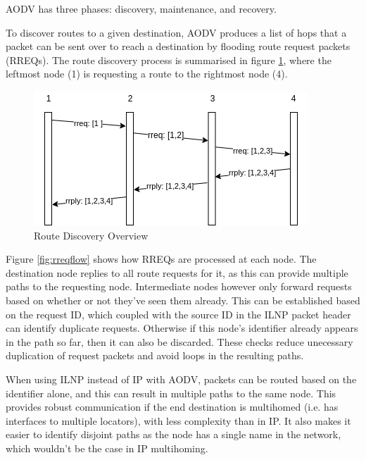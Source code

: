 \documentclass[12pt]{article}
\begin{document}
AODV has three phases: discovery, maintenance, and recovery.

To discover routes to a given destination, AODV produces a list of hops that a packet can be sent over to reach a destination by flooding route request packets (RREQs). The route discovery process is summarised in figure \ref{fig:path}, where the leftmost node (1) is requesting a route to the rightmost node (4).

\begin{figure}[!ht]
	\centering
	\includegraphics[width=\linewidth]{images/path}
	\caption{Route Discovery Overview}
	\label{fig:path}
\end{figure}

Figure \ref{fig:rreqflow} shows how RREQs are processed at each node. The destination node replies to all route requests for it, as this can provide multiple paths to the requesting node. Intermediate nodes however only forward requests based on whether or not they've seen them already. This can be established based on the request ID, which coupled with the source ID in the ILNP packet header can identify duplicate requests. Otherwise if this node's identifier already appears in the path so far, then it can also be discarded. These checks reduce unecessary duplication of request packets and avoid loops in the resulting paths.

When using ILNP instead of IP with AODV, packets can be routed based on the identifier alone, and this can result in multiple paths to the same node. This provides robust communication if the end destination is multihomed (i.e. has interfaces to multiple locators), with less complexity than in IP. It also makes it easier to identify disjoint paths as the node has a single name in the network, which wouldn't be the case in IP multihoming. 
\end{document}
